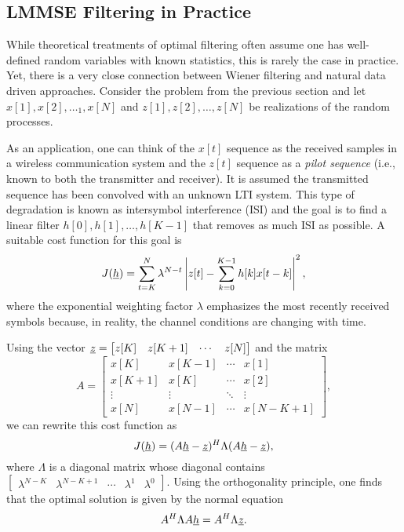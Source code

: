 \subsection{LMMSE Filtering in Practice}

While theoretical treatments of optimal filtering often assume one has well-defined random variables with known statistics, this is rarely the case in practice.
Yet, there is a very close connection between Wiener filtering and natural data driven approaches.
Consider the problem from the previous section and let $x[1],x[2],\ldots_1,x[N]$ and $z[1],z[2],\ldots,z[N]$ be realizations of the random processes.

As an application, one can think of the $x[t]$ sequence as the received samples in a wireless communication system and the $z[t]$ sequence as a \emph{pilot sequence} (i.e., known to both the transmitter and receiver).
It is assumed the transmitted sequence has been convolved with an unknown LTI system.
This type of degradation is known as intersymbol interference (ISI) and the goal is to find a linear filter $h[0],h[1],\ldots,h[K-1]$ that removes as much ISI as possible.
A suitable cost function for this goal is
\[ J(\underline{h}) = \sum_{t=K}^N \lambda^{N-t} \left| z[t] - \sum_{k=0}^{K-1} h[k] x[t-k] \right|^2, \]
where the exponential weighting factor $\lambda$ emphasizes the most recently received symbols because, in reality, the channel conditions are changing with time.

Using the vector $\underline{z} = \begin{bmatrix} z[K] & z[K+1] & \cdots & z[N] \end{bmatrix}$ and the matrix
\[ A = \begin{bmatrix} x[K] & x[K-1] & \cdots & x[1] \\ x[K+1] & x[K] & \cdots & x[2] \\ \vdots & \vdots & \ddots & \vdots \\ x[N] & x[N-1] & \cdots & x[N-K+1] \end{bmatrix} , \]
we can rewrite this cost function as
\[ J(\underline{h}) = (A\underline{h}-\underline{z})^H \Lambda (A\underline{h}-\underline{z}), \]
where $\Lambda$ is a diagonal matrix whose diagonal contains $\begin{bmatrix} \lambda^{N-K} & \lambda^{N-K+1} & \cdots & \lambda^1 & \lambda^0 \end{bmatrix}$.
Using the orthogonality principle, one finds that the optimal solution is given by the normal equation
\[ A^H \Lambda A \underline{h} = A^H \Lambda \underline{z}. \]

